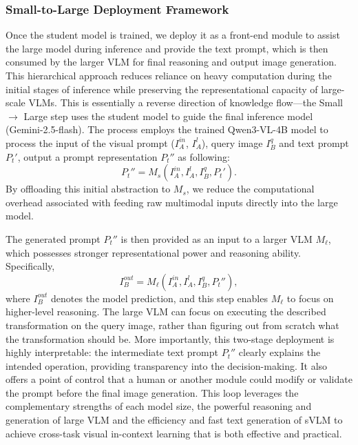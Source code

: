 \subsubsection{Small-to-Large Deployment Framework}

Once the student model is trained, we deploy it as a front-end module to assist the large model during inference and provide the text prompt, which is then consumed by the larger VLM for final reasoning and output image generation. This hierarchical approach reduces reliance on heavy computation during the initial stages of inference while preserving the representational capacity of large-scale VLMs. This is essentially a reverse direction of knowledge flow---the Small $\rightarrow$ Large step uses the student model to guide the final inference model (Gemini-2.5-flash). The process employs the trained Qwen3-VL-4B model to process the input of the visual prompt ($I_A^{in}$, $I_A^{l}$), query image $I_B^{q}$ and text prompt $P_t'$, output a prompt representation $P_t''$ as following:
\begin{equation}
P_t'' = M_s(I_A^{in}, I_A^l, I_B^q, P_t').
\end{equation}
By offloading this initial abstraction to $M_s$, we reduce the computational 
overhead associated with feeding raw multimodal inputs directly into the large model.

The generated prompt $P_t''$ is then provided as an input to a larger VLM $M_\ell$, which possesses stronger representational power and reasoning ability. Specifically, 
\begin{equation}
I_B^{out} = M_\ell(I_A^{in}, I_A^l, I_B^q, P_t''),
\end{equation}
where $I_B^{out}$ denotes the model prediction, and this step enables $M_\ell$ to focus on higher-level reasoning. The large VLM can focus on executing the described transformation on the query image, rather than figuring out from scratch what the transformation should be. More importantly, this two-stage deployment is highly interpretable: the intermediate text prompt $P_t''$ clearly explains the intended operation, providing transparency into the decision-making. It also offers a point of control that a human or another module could modify or validate the prompt before the final image generation. This loop leverages the complementary strengths of each model size, the powerful reasoning and generation of large VLM and the efficiency and fast text generation of sVLM to achieve cross-task visual in-context learning that is both effective and practical. 

